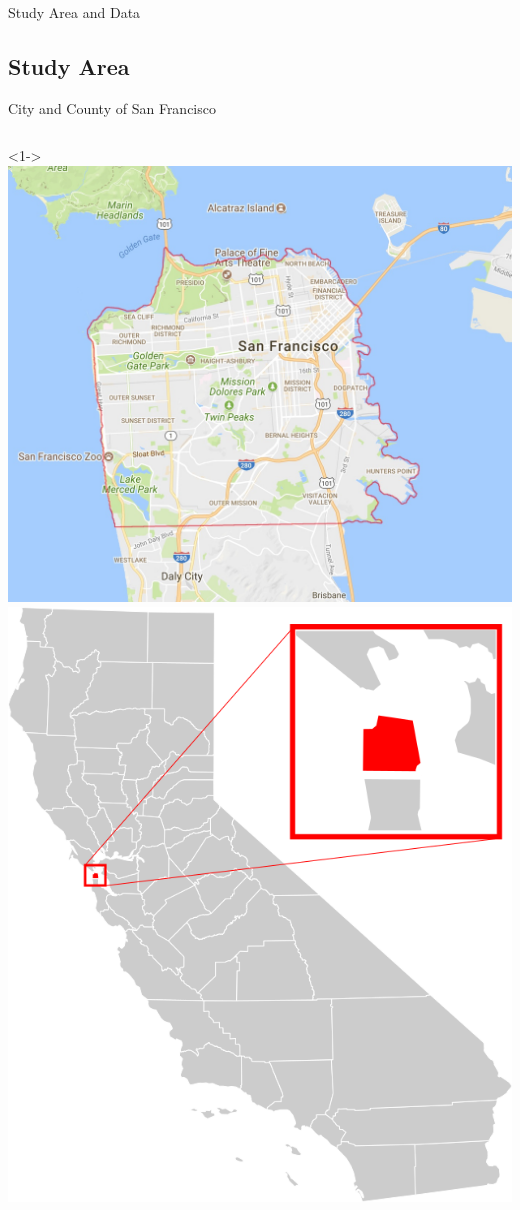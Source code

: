 \documentclass{beamer}
\begin{document}
\begin{section}{Study Area and Data}           %
    \subsection{Study Area}                    %
    \begin{frame}{City and County of San Francisco}
        \begin{columns}[T]
            <1->
                \includegraphics[width=\linewidth]{./images/sanfrancisco.jpg}
                \includegraphics[width=0.7\linewidth]{./images/california-sanfrancisco.png}

\end{columns}
\end{frame}
\end{section}
\end{document}
